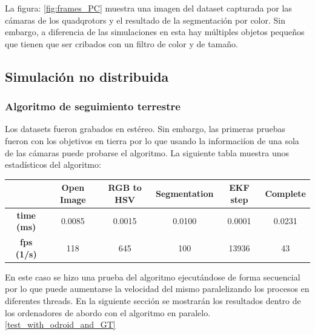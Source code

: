	La figura: \ref{fig:frames_PC} muestra una imagen del dataset capturada por las c\'amaras de los quadqrotors y el resultado de la segmentaci\'on por color. Sin embargo, a diferencia de las simulaciones en esta hay m\'ultiples objetos pequeños que tienen que ser cribados con un filtro de color y de tama\~no.

\subsection{Simulaci\'on no distribuida}	
	\subsubsection{Algoritmo de seguimiento terrestre}
	
	Los datasets fueron grabados en est\'ereo. Sin embargo, las primeras pruebas fueron con los objetivos en tierra por lo que usando la informaci\'ion de una sola de las c\'amaras puede probarse el algoritmo. La siguiente tabla muestra unos estad\'isticos del algoritmo: \\
	
	{
	\centering
		\begin{tabular}{|c|c|c|c|c||c|}
		\hline  					&  Open Image	&  RGB to HSV 	& Segmentation 	& EKF step  & Complete \\ 
		\hline  \textbf{time (ms)}	& 0.0085 		& 0.0015 		& 0.0100 		& 0.0001 	& 0.0231 	\\ 
		\hline  \textbf{fps (1/s)}	&  118			&  645			&  100			& 13936 	& 43 		\\ 
		\hline 
		\end{tabular} 
	}
	\newline

	{
	\label{Reference_fps_table}
	En este caso se hizo una prueba del algoritmo ejecut\'andose de forma secuencial por lo que puede aumentarse la velocidad del mismo paralelizando los procesos en diferentes threads. En la siguiente secci\'on se mostrar\'an los resultados dentro de los ordenadores de abordo con el algoritmo en paralelo. \ref{test_with_odroid_and_GT}
	}
	
